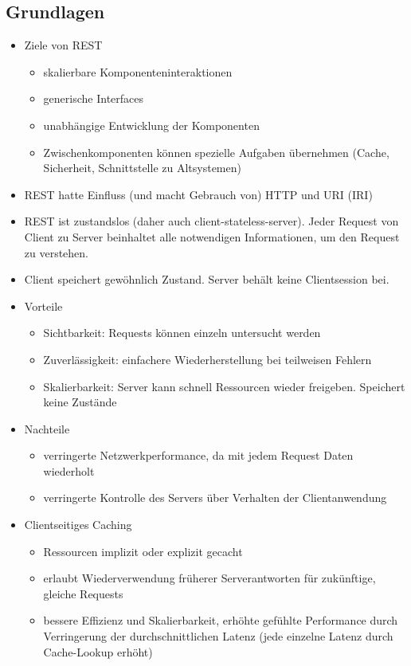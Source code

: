\subsection{Grundlagen}
\begin{itemize}
  \item Ziele von REST
  \begin{itemize}
    \item skalierbare Komponenteninteraktionen
    \item generische Interfaces
    \item unabhängige Entwicklung der Komponenten
    \item Zwischenkomponenten können spezielle Aufgaben übernehmen (Cache, Sicherheit, Schnittstelle zu Altsystemen)
  \end{itemize}
  \item REST hatte Einfluss (und macht Gebrauch von) HTTP und URI (IRI)
  \item REST ist zustandslos (daher auch client-stateless-server). Jeder Request von Client zu Server beinhaltet alle notwendigen Informationen, um den Request zu verstehen.
  \item Client speichert gewöhnlich Zustand. Server behält keine Clientsession bei.
  \item Vorteile
  \begin{itemize}
    \item Sichtbarkeit: Requests können einzeln untersucht werden
    \item Zuverlässigkeit: einfachere Wiederherstellung bei teilweisen Fehlern
    \item Skalierbarkeit: Server kann schnell Ressourcen wieder freigeben. Speichert keine Zustände
  \end{itemize}
  \item Nachteile
  \begin{itemize}
    \item verringerte Netzwerkperformance, da mit jedem Request Daten wiederholt
    \item verringerte Kontrolle des Servers über Verhalten der Clientanwendung
  \end{itemize}
  \item Clientseitiges Caching
  \begin{itemize}
    \item Ressourcen implizit oder explizit gecacht
    \item erlaubt Wiederverwendung früherer Serverantworten für zukünftige, gleiche Requests
    \item bessere Effizienz und Skalierbarkeit, erhöhte gefühlte Performance durch Verringerung der durchschnittlichen Latenz (jede einzelne Latenz durch Cache-Lookup erhöht)

\end{itemize}
\end{itemize}
